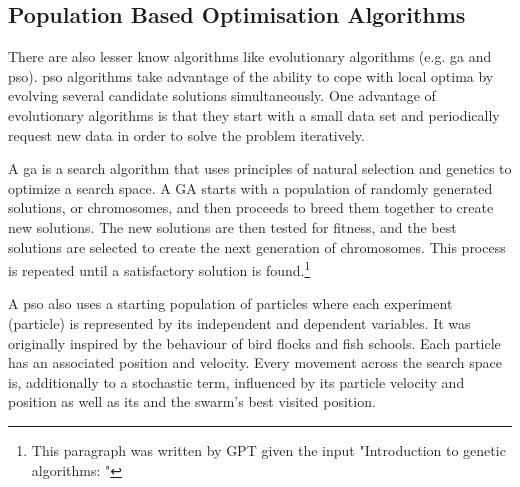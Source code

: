 

\subsection{Population Based Optimisation Algorithms}

There are also lesser know algorithms like 
evolutionary algorithms (e.g. \gls{ga} and \gls{pso}).
\gls{pso} algorithms take advantage of the ability to cope with local optima by evolving several candidate solutions simultaneously\cite{villanova2010function}.
%
One advantage of evolutionary algorithms is that they start with a small data set
and periodically request new data in order to solve the problem iteratively.

A \gls{ga} is a search algorithm that uses principles of natural selection and genetics to optimize a search space. A GA starts with a population of randomly generated solutions, or chromosomes, and then proceeds to breed them together to create new solutions. The new solutions are then tested for fitness, and the best solutions are selected to create the next generation of chromosomes. This process is repeated until a satisfactory solution is found.\footnote{This paragraph was written by GPT\cite{Liu2021gpt} given the input "Introduction to genetic algorithms: "}

\iffalse
\Gls{ga} uses a starting population of size $p$ ($p \in$ \td{N$^+$}) where each experiment (or data point) 
is represented by a fixed size genome of 0's and 1's in most cases. 
Each individual is then given a fitness value. 
New genomes are added and discarded from the population using 
selection, mutation and crossover operations.
\fi

A \gls{pso} also uses a starting population of particles where each experiment (particle) 
is represented by its independent and dependent variables. 
It was originally inspired by the behaviour of bird flocks and fish schools\cite{villanova2010function,Kennedy1995}.
Each particle has an associated position and velocity. 
Every movement across the search space is, 
additionally to a stochastic term, 
influenced by its particle velocity and position as well as its and the swarm's best visited position.


